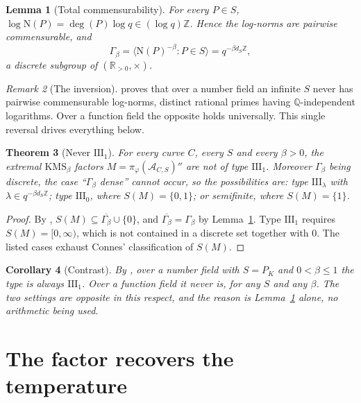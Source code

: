 \documentclass[11pt]{amsart}
\numberwithin{equation}{section}
\newtheorem{theorem}{Theorem}[section]
\newtheorem{lemma}[theorem]{Lemma}
\newtheorem{corollary}[theorem]{Corollary}
\theoremstyle{definition}
\theoremstyle{remark}
\newtheorem{remark}[theorem]{Remark}
\newcommand{\Z}{\mathbb{Z}}
\newcommand{\Q}{\mathbb{Q}}
\newcommand{\R}{\mathbb{R}}
\newcommand{\cA}{\mathcal{A}}
\newcommand{\Ns}{\mathrm{N}}
\begin{document}
\begin{lemma}[Total commensurability]\label{lem:commens}
For every $P\in S$, $\log\Ns(P)=\deg(P)\log q\in(\log q)\Z$. Hence the log-norms are
pairwise commensurable, and
\[
\Gamma_\beta=\bigl\langle\Ns(P)^{-\beta}:P\in S\bigr\rangle=q^{-\beta d_S\Z},
\]
a discrete subgroup of $(\R_{>0},\times)$.
\end{lemma}

\begin{remark}[The inversion]\label{rem:inversion}
\cite[Lem.~4.1]{SeriesI} proves that over a number field an infinite $S$ never has pairwise
commensurable log-norms, distinct rational primes having $\Q$-independent logarithms. Over a
function field the opposite holds universally. This single reversal drives everything below.
\end{remark}

\begin{theorem}[Never $\mathrm{III}_1$]\label{thm:neverIII1}
For every curve $C$, every $S$ and every $\beta>0$, the extremal $\mathrm{KMS}_\beta$ factors
$M=\pi_\varphi(\cA_{C,S})''$ are \emph{not} of type $\mathrm{III}_1$. Moreover
$\Gamma_\beta$ being discrete, the case ``$\Gamma_\beta$ dense'' cannot occur, so the
possibilities are: type $\mathrm{III}_\lambda$ with $\lambda\in q^{-\beta d_S\Z}$; type
$\mathrm{III}_0$, where $S(M)=\{0,1\}$; or semifinite, where $S(M)=\{1\}$.
\end{theorem}

\begin{proof}
By \cite[Prop.~6.1]{Main}, $S(M)\subseteq\overline{\Gamma_\beta}\cup\{0\}$, and
$\overline{\Gamma_\beta}=\Gamma_\beta$ by Lemma~\ref{lem:commens}. Type $\mathrm{III}_1$
requires $S(M)=[0,\infty)$, which is not contained in a discrete set together with $0$. The
listed cases exhaust Connes' classification of $S(M)$.
\end{proof}

\begin{corollary}[Contrast]\label{cor:contrast}
By \cite[Thm.~3.2]{SeriesI}, over a number field with $S=P_K$ and $0<\beta\le1$ the type is
always $\mathrm{III}_1$. Over a function field it never is, for any $S$ and any $\beta$. The
two settings are opposite in this respect, and the reason is Lemma~\ref{lem:commens} alone,
no arithmetic being used.
\end{corollary}

\section{The factor recovers the temperature}
\end{document}
